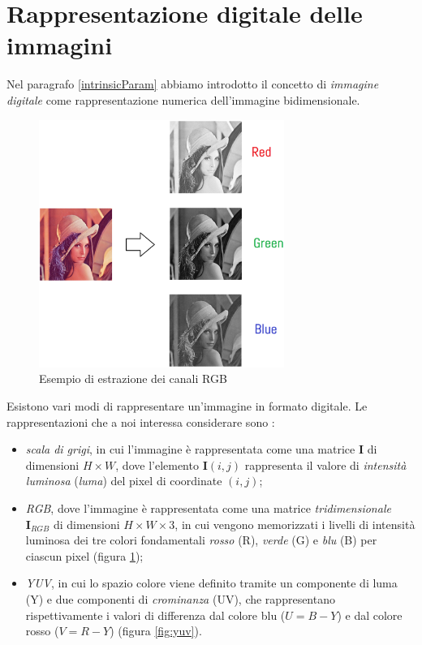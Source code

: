 \section{Rappresentazione digitale delle immagini}
\label{rappresentazImmagini}
Nel paragrafo \ref{intrinsicParam} abbiamo introdotto il concetto di \textit{immagine digitale} come rappresentazione numerica dell'immagine bidimensionale.
	\begin{figure}
		\centering
		\includegraphics[width=8cm]{./pictures/lenaRGB}
		\caption{Esempio di estrazione dei canali RGB}
		\label{fig:lenaRGB}
	\end{figure}
Esistono vari modi di rappresentare un'immagine in formato digitale.
Le rappresentazioni che a noi interessa considerare sono \cite{forsyth2002computer}:
\begin{itemize}
	\item \textit{scala di grigi}, in cui l'immagine \`e rappresentata come una matrice $\textbf{I}$ di dimensioni $H \times W$, dove l'elemento $\textbf{I}(i,j)$ rappresenta il valore di \textit{intensit\`a luminosa} (\textit{luma}) del pixel di coordinate $(i, j)$;
	\item \textit{RGB}, dove l'immagine \`e rappresentata come una matrice \textit{tridimensionale} $\textbf{I}_{RGB}$ di dimensioni $H \times W \times 3$, in cui vengono memorizzati i livelli di intensit\`a luminosa dei tre colori fondamentali \textit{rosso} (R), \textit{verde} (G) e \textit{blu} (B) per ciascun pixel (figura \ref{fig:lenaRGB}); 
	\item \textit{YUV}, in cui lo spazio colore viene definito tramite un componente di luma (Y) e due componenti di \textit{crominanza} (UV), che rappresentano rispettivamente i valori di differenza dal colore blu ($U = B - Y$) e dal colore rosso ($V = R - Y$) (figura \ref{fig:yuv}).
\end{itemize}
